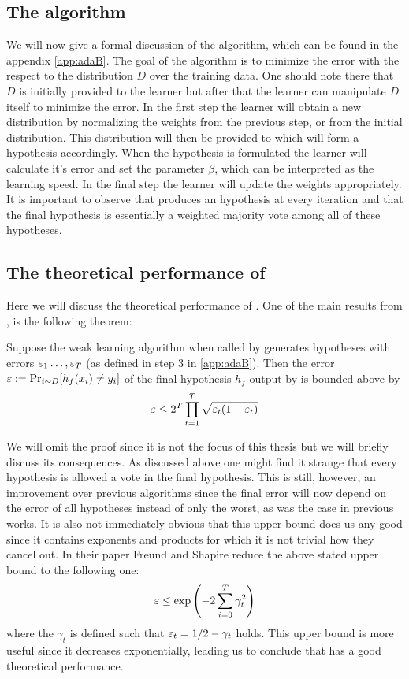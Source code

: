 \subsection{The algorithm}
\label{subsec:algo}
We will now give a formal discussion of the \adaB\cite{Freund1997} algorithm, which can be found in the appendix \ref{app:adaB}. The goal of the algorithm is to minimize the error with the respect to the distribution $D$ over the training data. One should note there that $D$ is initially provided to the learner but after that the learner can manipulate $D$ itself to minimize the error. In the first step the learner will obtain a new distribution by normalizing the weights from the previous step, or from the initial distribution. This distribution will then be provided to \weak which will form a hypothesis accordingly. When the hypothesis is formulated the learner will calculate it's error and set the parameter $\beta$, which can be interpreted as the learning speed. In the final step the learner will update the weights appropriately. It is important to observe that \weak produces an hypothesis at every iteration and that the final hypothesis is essentially a weighted majority vote among all of these hypotheses. 


\subsection{The theoretical performance of \adaB}
\label{subsec:perf}
Here we will discuss the theoretical performance of \adaB. One of the main results from \cite{Freund1997}, is the following theorem: 
\begin{theorem}\label{thm:adaErr}\cite{Freund1997}
Suppose the weak learning algorithm \weak when called by \adaB generates hypotheses with errors $\varepsilon_1\ldots, \varepsilon_T$ (as defined in step 3 in \ref{app:adaB}). Then the error \\$\varepsilon:=\Pr_{i\sim D}[h_f(x_i)\neq y_i]$ of the final hypothesis $h_f$ output by \adaB is bounded above by $$\varepsilon\leq 2^T\prod^T_{t=1}\sqrt{\varepsilon_t(1-\varepsilon_t)}$$
\end{theorem}
We will omit the proof since it is not the focus of this thesis but we will briefly discuss its consequences. As discussed above one might find it strange that every hypothesis is allowed a vote in the final hypothesis. This is still, however, an improvement over previous algorithms since the final error will now depend on the error of all hypotheses instead of only the worst, as was the case in previous works. It is also not immediately obvious that this upper bound does us any good since it contains exponents and products for which it is not trivial how they cancel out. In their paper Freund and Shapire reduce the above stated upper bound to the following one: $$\varepsilon\leq \exp\left(-2\sum^T_{i=0}\gamma_t^2\right)$$ where the $\gamma_t$ is defined such that $\varepsilon_t=1/2-\gamma_t$ holds. This upper bound is more useful since it decreases exponentially, leading us to conclude that \adaB has a good theoretical performance.   

